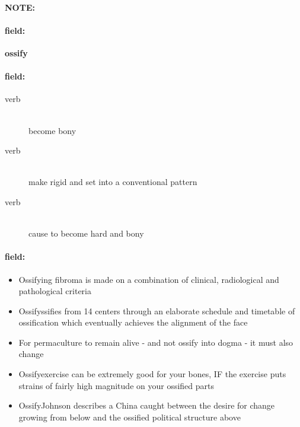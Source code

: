 \documentclass[12pt]{article}
\newenvironment{note}{\paragraph{NOTE:}}{}
\newenvironment{field}{\paragraph{field:}}{}
\begin{document}
\begin{note}
\begin{field}
\textbf{\large ossify}
\end{field}


\begin{field}
\begin{description}
\item[verb] \hfill \\ 
become bony

\item[verb] \hfill \\ 
make rigid and set into a conventional pattern

\item[verb] \hfill \\ 
cause to become hard and bony

\end{description}
\end{field}

\begin{field}
\begin{itemize}
\item Ossifying fibroma is made on a combination of clinical, radiological and pathological criteria
\item Ossifyssifies from 14 centers through an elaborate schedule and timetable of ossification which eventually achieves the alignment of the face
\item For permaculture to remain alive - and not ossify into dogma - it must also change
\item Ossifyexercise can be extremely good for your bones, IF the exercise puts strains of fairly high magnitude on your ossified parts
\item OssifyJohnson describes a China caught between the desire for change growing from below and the ossified political structure above
\end{itemize}
\end{field}
\end{note}
\end{document}
